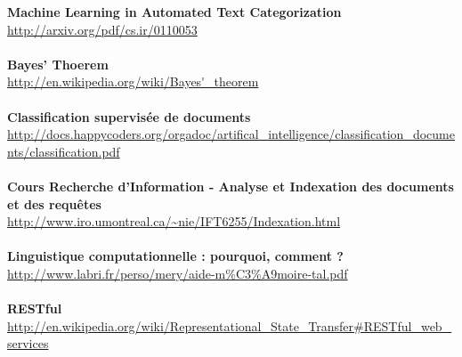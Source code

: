 \documentclass[a4paper,11pt]{article}
\begin{document}
\textbf{Machine Learning in Automated Text Categorization} \\
\url{http://arxiv.org/pdf/cs.ir/0110053} \\
~\\
\textbf{Bayes' Thoerem} \\
\url{http://en.wikipedia.org/wiki/Bayes'_theorem} \\
~\\
\textbf{Classification supervisée de documents} \\
\url{http://docs.happycoders.org/orgadoc/artifical_intelligence/classification_documents/classification.pdf} \\
~\\
\textbf{Cours Recherche d'Information - Analyse et Indexation des documents et des requêtes} \\
\url{http://www.iro.umontreal.ca/~nie/IFT6255/Indexation.html} \\
~\\
\textbf{Linguistique computationnelle : pourquoi, comment ?} \\
\url{http://www.labri.fr/perso/mery/aide-m\%C3\%A9moire-tal.pdf} \\
~\\
\textbf{RESTful} \\
\url{http://en.wikipedia.org/wiki/Representational_State_Transfer#RESTful_web_services} \\
\end{document}
